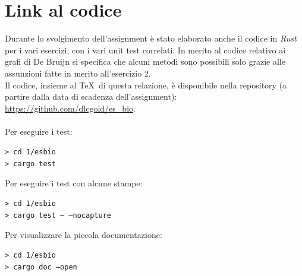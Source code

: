 \documentclass[a4paper,12pt, oneside]{book}
\begin{document}
\chapter{Link al codice}
Durante lo svolgimento dell'assignment è stato elaborato anche il codice in
\textit{Rust} per i vari esercizi, con i vari unit test correlati. In merito al
codice relativo ai grafi di De Bruijn si specifica che alcuni metodi sono
possibili solo grazie alle assunzioni fatte in merito all'esercizio 2.\\
Il codice, insieme al \TeX\,  di questa relazione, è disponibile nella
repository (a partire dalla data di scadenza dell'assignment):
\url{https://github.com/dlcgold/es_bio}.\\ 
\\
Per eseguire i test:
\begin{shaded}
  \noindent
  \texttt{> cd 1/esbio}\\
  \texttt{> cargo test}
\end{shaded}
\noindent
Per eseguire i test con alcune stampe:
\begin{shaded}
  \noindent
  \texttt{> cd 1/esbio}\\
  \texttt{> cargo test -- --nocapture}
\end{shaded}
\noindent
Per visualizzare la piccola documentazione:
\begin{shaded}
  \noindent
  \texttt{> cd 1/esbio}\\
  \texttt{> cargo doc --open}
\end{shaded}
\end{document}
